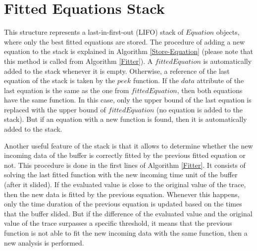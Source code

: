 \section{Fitted Equations Stack}
This structure represents a last-in-first-out (LIFO) stack of $Equation$ objects, where only the best fitted equations are stored. 
%
The procedure of adding a new equation to the stack is explained in Algorithm \ref{Store-Equation} (please note that this method is called from Algorithm \ref{Fitter}). 
%
A $fittedEquation$ is automatically added to the stack whenever it is empty.
%
Otherwise, a reference of the last equation of the stack is taken by the $peek$ function.
%
If the $data$ attribute of the last equation is the same as the one from $fittedEquation$, then both equations have the same function.
%
In this case, only the upper bound of the last equation is replaced with the upper bound of $fittedEquation$ (no equation is added to the stack). 
%
But if an equation with a new function is found, then it is automatically added to the stack.



Another useful feature of the stack is that it allows to determine whether the new incoming data of the buffer is correctly fitted by the previous fitted equation or not. 
%
This procedure is done in the first lines of Algorithm \ref{Fitter}.
%
It consists of solving the last fitted function with the new incoming time unit of the buffer (after it slided). 
%
If the evaluated value is close to the original value of the trace, then the new data is fitted by the previous equation. Whenever this happens, only the time duration of the previous equation is updated based on the times that the buffer slided. But if the difference of the evaluated value and the original value of the trace surpasses a specific threshold, it means that the previous function is not able to fit the new incoming data with the same function, then a new analysis is performed. 

%




